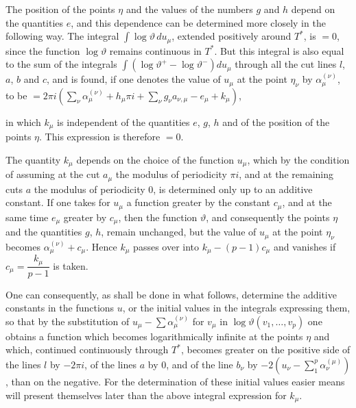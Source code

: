 \documentclass{article}
\begin{document}
The position of the points $\eta$ and the values of the numbers $g$ and $h$ depend on the quantities $e$, and this dependence can be determined more closely in the following way. The integral $\displaystyle\int \log\vartheta\, du_{\mu}$, extended positively around $T^{*}$, is $= 0$, since the function $\log\vartheta$ remains continuous in $T^{*}$. But this integral is also equal to the sum of the integrals $\displaystyle\int (\log\vartheta^{+} - \log\vartheta^{-}) du_{\mu}$ through all the cut lines $l$, $a$, $b$ and $c$, and is found, if one denotes the value of $u_{\mu}$ at the point $\eta_{\nu}$ by $\alpha_{\mu}^{(\nu)}$, to be $= 2\pi i \left(\displaystyle\sum_{\nu} \alpha_{\mu}^{(\nu)} + h_{\mu}\pi i + \sum_{\nu} g_{\nu} a_{\nu,\mu} - e_{\mu} + k_{\mu}\right)$,

in which $k_{\mu}$ is independent of the quantities $e$, $g$, $h$ and of the position of the points $\eta$. This expression is therefore $= 0$.

The quantity $k_{\mu}$ depends on the choice of the function $u_{\mu}$, which by the condition of assuming at the cut $a_{\mu}$ the modulus of periodicity $\pi i$, and at the remaining cuts $a$ the modulus of periodicity 0, is determined only up to an additive constant. If one takes for $u_{\mu}$ a function greater by the constant $c_{\mu}$, and at the same time $e_{\mu}$ greater by $c_{\mu}$, then the function $\vartheta$, and consequently the points $\eta$ and the quantities $g$, $h$, remain unchanged, but the value of $u_{\mu}$ at the point $\eta_{\nu}$ becomes $\alpha_{\mu}^{(\nu)} + c_{\mu}$. Hence $k_{\mu}$ passes over into $k_{\mu} - (p-1)c_{\mu}$ and vanishes if $c_{\mu} = \dfrac{k_{\mu}}{p-1}$ is taken.

One can consequently, as shall be done in what follows, determine the additive constants in the functions $u$, or the initial values in the integrals expressing them, so that by the substitution of $u_{\mu} - \displaystyle\sum \alpha_{\mu}^{(\nu)}$ for $v_{\mu}$ in $\log\vartheta(v_{1}, \ldots, v_{p})$ one obtains a function which becomes logarithmically infinite at the points $\eta$ and which, continued continuously through $T^{*}$, becomes greater on the positive side of the lines $l$ by $-2\pi i$, of the lines $a$ by 0, and of the line $b_{\nu}$ by $-2\left(u_{\nu} - \displaystyle\sum_{1}^{p} \alpha_{\nu}^{(\mu)}\right)$, than on the negative. For the determination of these initial values easier means will present themselves later than the above integral expression for $k_{\mu}$.
\end{document}
